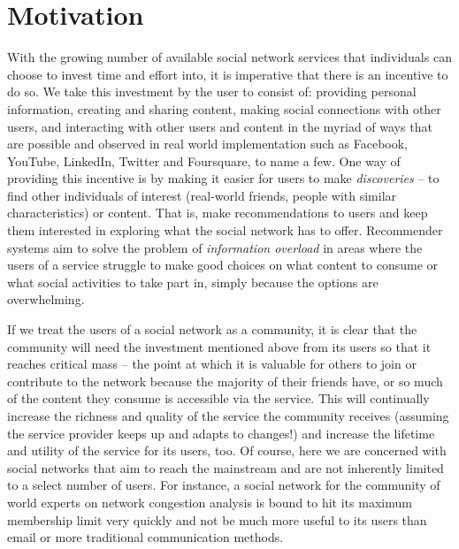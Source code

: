 \documentclass[a4paper,12pt,twoside,notitlepage,draft]{report}
\begin{document}
\section{Motivation}

With the growing number of available social network services that individuals 
can choose to invest time and effort into, it is imperative that there is an 
incentive to do so. We take this investment by the user to consist of: 
providing personal information, creating and sharing content, making social 
connections with other users, and interacting with other users and content in 
the myriad of ways that are possible and observed in real world implementation 
such as Facebook, YouTube, LinkedIn, Twitter and Foursquare, to name a few. One 
way of providing this incentive is by making it easier for users to make 
\emph{discoveries} -- to find other individuals of interest (real-world 
friends, people with similar characteristics) or content. That is, make 
recommendations to users and keep them interested in exploring what the social 
network has to offer. Recommender systems aim to solve the problem of 
\emph{information overload} in areas where the users of a service struggle to 
make good choices on what content to consume or what social activities to take 
part in, simply because the options are overwhelming.

If we treat the users of a social network as a community, it is clear that the 
community will need the investment mentioned above from its users so that it 
reaches critical mass -- the point at which it is valuable for others to join 
or contribute to the network because the majority of their friends have, or so 
much of the content they consume is accessible via the service. This will 
continually increase the richness and quality of the service the community 
receives (assuming the service provider keeps up and adapts to changes!) and 
increase the lifetime and utility of the service for its users, too. Of course, 
here we are concerned with social networks that aim to reach the mainstream and 
are not inherently limited to a select number of users. For instance, a social 
network for the community of world experts on network congestion analysis is 
bound to hit its maximum membership limit very quickly and not be much more 
useful to its users than email or more traditional communication methods.
\end{document}
